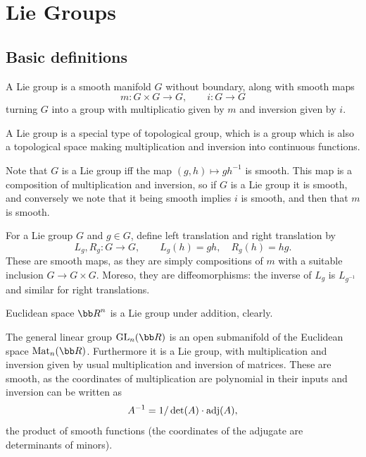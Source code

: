 \section{Lie Groups}

\subsection{Basic definitions}

\bdefn

    A {\emphcolor Lie group} is a smooth manifold $G$ without boundary, along with smooth maps
    $$ m\colon G\times G\to G,\qquad i\colon G\to G $$
    turning $G$ into a group with multiplicatio given by $m$ and inversion given by $i$.

\edefn

\bnote

    A Lie group is a special type of {\emphcolor topological group}, which is a group which is also a topological space making
    multiplication and inversion into continuous functions.

\enote

Note that $G$ is a Lie group iff the map $(g,h)\mapsto gh^{-1}$ is smooth.
This map is a composition of multiplication and inversion, so if $G$ is a Lie group it is smooth, and conversely we note that it being smooth
implies $i$ is smooth, and then that $m$ is smooth.

For a Lie group $G$ and $g\in G$, define {\emphcolor left translation} and {\emphcolor right translation} by
$$ L_g,R_g\colon G\to G,\qquad L_g(h) = gh,\quad R_g(h) = hg . $$
These are smooth maps, as they are simply compositions of $m$ with a suitable inclusion $G\to G\times G$.
Moreso, they are diffeomorphisms: the inverse of $L_g$ is $L_{g^{-1}}$ and similar for right translations.

\bexam

    Euclidean space $\bR^n$ is a Lie group under addition, clearly.

\eexam

\bexam

    The general linear group $\gl_n(\bR)$ is an open submanifold of the Euclidean space $\mat_n(\bR)$.
    Furthermore it is a Lie group, with multiplication and inversion given by usual multiplication and inversion of matrices.
    These are smooth, as the coordinates of multiplication are polynomial in their inputs and inversion can be written as
    $$ A^{-1} = 1/\det(A)\cdot{\rm adj}(A) , $$
    the product of smooth functions (the coordinates of the adjugate are determinants of minors).

